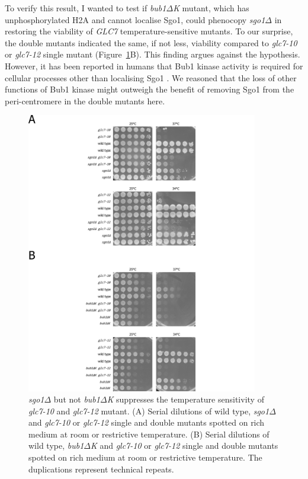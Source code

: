 To verify this result, I wanted to test if \textit{bub1$\Delta$K} mutant, which has unphosphorylated H2A and cannot localise Sgo1, could phenocopy \textit{sgo1$\Delta$} in restoring the viability of \textit{GLC7} temperature-sensitive mutants. To our surprise, the double mutants indicated the same, if not less, viability compared to \textit{glc7-10} or \textit{glc7-12} single mutant (Figure~\ref{fig:growthassay}B). This finding argues against the hypothesis. However, it has been reported in humans that Bub1 kinase activity is required for cellular processes other than localising Sgo1 \citep{Tang2004, Nyati2015TheSignaling, Li2018TheReplication, Zhang2020FunctioningMitosis}. We reasoned that the loss of other functions of Bub1 kinase might outweigh the benefit of removing Sgo1 from the peri-centromere in the double mutants here. 

\begin{figure}[htbp]
  \centering
  \includegraphics[width=0.9\textwidth]{chapter3/figures/glc7 mutants growth assaay.pdf}
  \caption[\textit{sgo1$\Delta$} but not \textit{bub1$\Delta$K} suppresses the temperature sensitivity of \textit{glc7-10} and \textit{glc7-12} mutant]{\textit{sgo1$\Delta$} but not \textit{bub1$\Delta$K} suppresses the temperature sensitivity of \textit{glc7-10} and \textit{glc7-12} mutant. (A) Serial dilutions of wild type, \textit{sgo1$\Delta$} and \textit{glc7-10} or \textit{glc7-12} single and double mutants spotted on rich medium at room or restrictive temperature. (B) Serial dilutions of wild type, \textit{bub1$\Delta$K} and \textit{glc7-10} or \textit{glc7-12} single and double mutants spotted on rich medium at room or restrictive temperature. The duplications represent technical repeats. }
  \label{fig:growthassay}
\end{figure}

